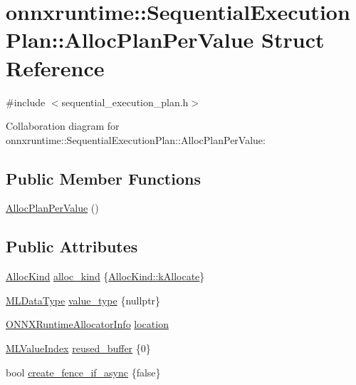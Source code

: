 \hypertarget{structonnxruntime_1_1SequentialExecutionPlan_1_1AllocPlanPerValue}{}\section{onnxruntime\+:\+:Sequential\+Execution\+Plan\+:\+:Alloc\+Plan\+Per\+Value Struct Reference}
\label{structonnxruntime_1_1SequentialExecutionPlan_1_1AllocPlanPerValue}


{\ttfamily \#include $<$sequential\+\_\+execution\+\_\+plan.\+h$>$}



Collaboration diagram for onnxruntime\+:\+:Sequential\+Execution\+Plan\+:\+:Alloc\+Plan\+Per\+Value\+:
\subsection*{Public Member Functions}
\begin{DoxyCompactItemize}
\item 
\mbox{\hyperlink{structonnxruntime_1_1SequentialExecutionPlan_1_1AllocPlanPerValue_a4a48f7b59b2c2287f1385e3a11cf97d1}{Alloc\+Plan\+Per\+Value}} ()
\end{DoxyCompactItemize}
\subsection*{Public Attributes}
\begin{DoxyCompactItemize}
\item 
\mbox{\hyperlink{namespaceonnxruntime_a96c3d8f2cb52b6f3e388d72f37e6fc7c}{Alloc\+Kind}} \mbox{\hyperlink{structonnxruntime_1_1SequentialExecutionPlan_1_1AllocPlanPerValue_af09dff1a8e85c5897d128e3b3e2b2867}{alloc\+\_\+kind}} \{\mbox{\hyperlink{namespaceonnxruntime_a96c3d8f2cb52b6f3e388d72f37e6fc7ca54e5dee0493e6f41261c753982bda41a}{Alloc\+Kind\+::k\+Allocate}}\}
\item 
\mbox{\hyperlink{namespaceonnxruntime_ad77d0a6e838ec7da5dc35fed5ee66b49}{M\+L\+Data\+Type}} \mbox{\hyperlink{structonnxruntime_1_1SequentialExecutionPlan_1_1AllocPlanPerValue_a39a898ec72a22825907bddad7ed83a6c}{value\+\_\+type}} \{nullptr\}
\item 
\mbox{\hyperlink{structONNXRuntimeAllocatorInfo}{O\+N\+N\+X\+Runtime\+Allocator\+Info}} \mbox{\hyperlink{structonnxruntime_1_1SequentialExecutionPlan_1_1AllocPlanPerValue_a9b5e682e8a4e0e4819611beed3d531f5}{location}}
\item 
\mbox{\hyperlink{namespaceonnxruntime_ab37a9454e2bb44bd7f75a95158097c8a}{M\+L\+Value\+Index}} \mbox{\hyperlink{structonnxruntime_1_1SequentialExecutionPlan_1_1AllocPlanPerValue_a5b05461bd040be2df7c6d524aa9c3b76}{reused\+\_\+buffer}} \{0\}
\item 
bool \mbox{\hyperlink{structonnxruntime_1_1SequentialExecutionPlan_1_1AllocPlanPerValue_a2ccb6258735bad4c033d1902fcf2fb0e}{create\+\_\+fence\+\_\+if\+\_\+async}} \{false\}
\end{DoxyCompactItemize}


